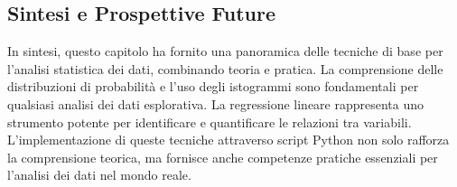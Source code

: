 \subsection{Sintesi e Prospettive Future}

In sintesi, questo capitolo ha fornito una panoramica delle tecniche di base per l'analisi statistica dei dati, combinando teoria e pratica. La comprensione delle distribuzioni di probabilità e l'uso degli istogrammi sono fondamentali per qualsiasi analisi dei dati esplorativa. La regressione lineare rappresenta uno strumento potente per identificare e quantificare le relazioni tra variabili. L'implementazione di queste tecniche attraverso script Python non solo rafforza la comprensione teorica, ma fornisce anche competenze pratiche essenziali per l'analisi dei dati nel mondo reale.









